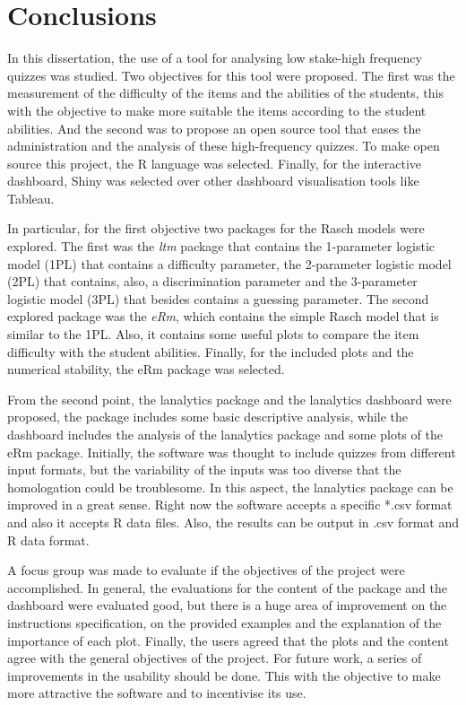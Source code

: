 \chapter{Conclusions}
In this dissertation, the use of a tool for analysing low stake-high frequency quizzes was studied. Two objectives for this tool were proposed. The first was the measurement of the difficulty of the items and the abilities of the students, this with the objective to make more suitable the items according to the student abilities. And the second was to propose an open source tool that eases the administration and the analysis of these high-frequency quizzes. To make open source this project, the R language was selected. Finally, for the interactive dashboard, Shiny was selected over other dashboard visualisation tools like Tableau. 

In particular, for the first objective two packages for the Rasch models were explored. The first was the \textit{ltm} package that contains the 1-parameter logistic model (1PL) that contains a difficulty parameter, the 2-parameter logistic model (2PL) that contains, also, a discrimination parameter and the 3-parameter logistic model (3PL) that besides contains a guessing parameter. The second explored package was the \textit{eRm}, which contains the simple Rasch model that is similar to the 1PL. Also, it contains some useful plots to compare the item difficulty with the student abilities. Finally, for the included plots and the numerical stability, the eRm package was selected.

From the second point, the lanalytics package and the lanalytics dashboard were proposed, the package includes some basic descriptive analysis, while the dashboard includes the analysis of the lanalytics package and some plots of the eRm package. Initially, the software was thought to include quizzes from different input formats, but the variability of the inputs was too diverse that the homologation could be troublesome. In this aspect, the lanalytics package can be improved in a great sense. Right now the software accepts a specific *.csv format and also it accepts R data files. Also, the results can be output in .csv format and R data format. 

A focus group was made to evaluate if the objectives of the project were accomplished. In general, the evaluations for the content of the package and the dashboard were evaluated good, but there is a huge area of improvement on the instructions specification, on the provided examples and the explanation of the importance of each plot. Finally, the users agreed that the plots and the content agree with the general objectives of the project. For future work, a series of improvements in the usability should be done. This with the objective to make more attractive the software and to incentivise its use.